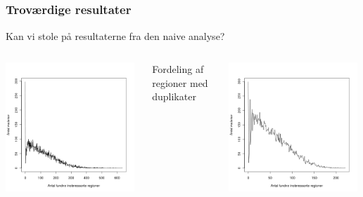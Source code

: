 \documentclass[xcolor=table]{beamer}
\begin{document}
\subsection*{}
\begin{frame}

    \frametitle{Troværdige resultater}

    Kan vi stole på resultaterne fra den naive analyse?

    \begin{columns}[t]
            \centering
            \includegraphics[width=0.98\textwidth]{billeder/totalregions_var}

            Fordeling af regioner med duplikater

            \centering
            \includegraphics[width=0.98\textwidth]{billeder/totalregions_var_ny}


\end{columns}
\end{frame}
\end{document}
